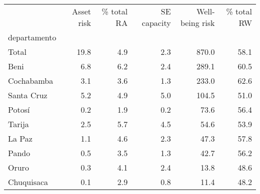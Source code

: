 \begin{tabular}{lrrrrr}
\toprule
{} &  Asset risk &  \% total RA &  SE capacity &  Well-being risk &  \% total RW \\
departamento &             &             &              &                  &             \\
\midrule
Total        &        19.8 &         4.9 &          2.3 &            870.0 &        58.1 \\
Beni         &         6.8 &         6.2 &          2.4 &            289.1 &        60.5 \\
Cochabamba   &         3.1 &         3.6 &          1.3 &            233.0 &        62.6 \\
Santa Cruz   &         5.2 &         4.9 &          5.0 &            104.5 &        51.0 \\
Potosí       &         0.2 &         1.9 &          0.2 &             73.6 &        56.4 \\
Tarija       &         2.5 &         5.7 &          4.5 &             54.6 &        53.9 \\
La Paz       &         1.1 &         4.6 &          2.3 &             47.3 &        57.8 \\
Pando        &         0.5 &         3.5 &          1.3 &             42.7 &        56.2 \\
Oruro        &         0.3 &         4.1 &          2.4 &             13.8 &        48.6 \\
Chuquisaca   &         0.1 &         2.9 &          0.8 &             11.4 &        48.2 \\
\bottomrule
\end{tabular}
